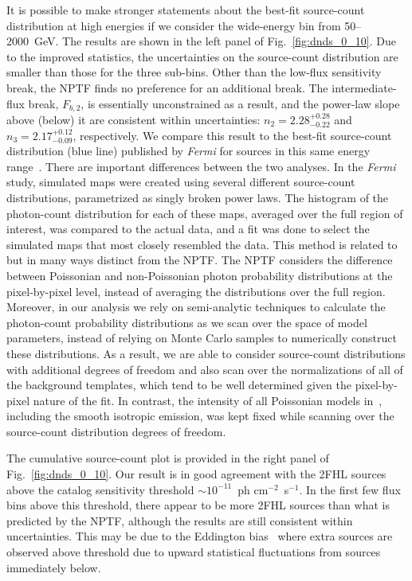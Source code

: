 It is possible to make stronger statements about the best-fit source-count distribution at high energies if we consider the wide-energy bin from 50--2000~GeV.  The results are shown in the left panel of Fig.~\ref{fig:dnds_0_10}.  Due to the improved statistics, the uncertainties on the source-count distribution are smaller than those for the three sub-bins.  Other than the low-flux sensitivity break, the NPTF finds no preference for  an additional break.  The intermediate-flux break, $F_{b,2}$, is essentially unconstrained as a result, and the power-law slope above (below) it are consistent within uncertainties: $n_2 = 2.28_{-0.22}^{+0.28}$ and $n_3 = 2.17_{-0.09}^{+0.12}$, respectively.  We compare this result to the best-fit source-count distribution (blue line) published by \emph{Fermi} for sources in this same energy range~\cite{TheFermi-LAT:2015ykq}.  There are important differences between the two analyses.  In the \emph{Fermi} study, simulated maps were created using several different source-count distributions, parametrized as singly broken power laws.  The histogram of the photon-count distribution for each of these maps, averaged over the full region of interest, was compared to the actual data, and a fit was done to select the simulated maps that most closely resembled the data.  
This method is related to but in many ways distinct from the NPTF.  The NPTF considers the difference between Poissonian and non-Poissonian photon probability distributions at the pixel-by-pixel level, instead of averaging the distributions over the full region.  Moreover, in our analysis we rely on semi-analytic techniques to calculate the photon-count probability distributions as we scan over the space of model parameters, instead of relying on Monte Carlo samples to numerically construct these distributions.  As a result, we are able to consider source-count distributions with additional degrees of freedom and also scan over the normalizations of all of the background templates, which tend to be well determined given the pixel-by-pixel nature of the fit.  In contrast, the intensity of all Poissonian models in~\cite{TheFermi-LAT:2015ykq}, including the smooth isotropic emission, was kept fixed while scanning over the source-count distribution degrees of freedom.  


The cumulative source-count plot is provided in the right panel of Fig.~\ref{fig:dnds_0_10}.  Our result is in good agreement with the 2FHL sources above the catalog sensitivity threshold $\sim$$10^{-11}$~ph cm$^{-2}$~s$^{-1}$.  In the first few flux bins above this threshold, there appear to be more 2FHL sources than what is predicted by the NPTF, although the results are still consistent within uncertainties.  This may be due to the Eddington bias~\cite{Eddington} where extra sources are observed above threshold due to upward statistical fluctuations from sources immediately below.

